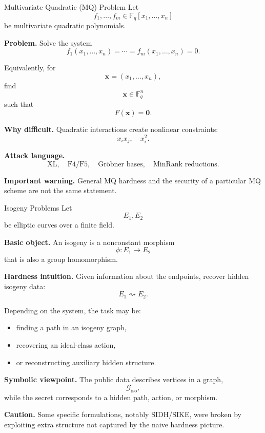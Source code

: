 \documentclass[aspectratio=169]{beamer}
\begin{document}
	\begin{frame}{Multivariate Quadratic (MQ) Problem}
		Let
		\[
		f_1,\dots,f_m \in \mathbb{F}_q[x_1,\dots,x_n]
		\]
		be multivariate quadratic polynomials.
		
		\textbf{Problem.}
		Solve the system
		\[
		f_1(x_1,\dots,x_n)=\cdots=f_m(x_1,\dots,x_n)=0.
		\]
		
		\vspace{0.4em}
		Equivalently, for
		\[
		\bm{x}=(x_1,\dots,x_n),
		\]
		find
		\[
		\bm{x} \in \mathbb{F}_q^n
		\]
		such that
		\[
		F(\bm{x})=\bm{0}.
		\]
		
		\vspace{0.4em}
		\textbf{Why difficult.}
		Quadratic interactions create nonlinear constraints:
		\[
		x_ix_j,\quad x_i^2.
		\]
		
		\vspace{0.4em}
		\textbf{Attack language.}
		\[
		\text{XL}, \quad \text{F4/F5}, \quad \text{Gr\"obner bases}, \quad \text{MinRank reductions}.
		\]
		
		\vspace{0.4em}
		\textbf{Important warning.}
		General MQ hardness and the security of a particular MQ scheme are not the same statement.
	\end{frame}
	
	
	\begin{frame}{Isogeny Problems}
		Let
		\[
		E_1, E_2
		\]
		be elliptic curves over a finite field.
		
		\textbf{Basic object.}
		An isogeny is a nonconstant morphism
		\[
		\phi : E_1 \to E_2
		\]
		that is also a group homomorphism.
		
		\vspace{0.4em}
		\textbf{Hardness intuition.}
		Given information about the endpoints, recover hidden isogeny data:
		\[
		E_1 \rightsquigarrow E_2.
		\]
		
		Depending on the system, the task may be:
		\begin{itemize}
			\item finding a path in an isogeny graph,
			\item recovering an ideal-class action,
			\item or reconstructing auxiliary hidden structure.
		\end{itemize}
		
		\vspace{0.4em}
		\textbf{Symbolic viewpoint.}
		The public data describes vertices in a graph,
		\[
		\mathcal{G}_{\mathrm{iso}},
		\]
		while the secret corresponds to a hidden path, action, or morphism.
		
		\vspace{0.4em}
		\textbf{Caution.}
		Some specific formulations, notably SIDH/SIKE, were broken by exploiting extra structure not captured by the naive hardness picture.
	\end{frame}
	
\end{document}
